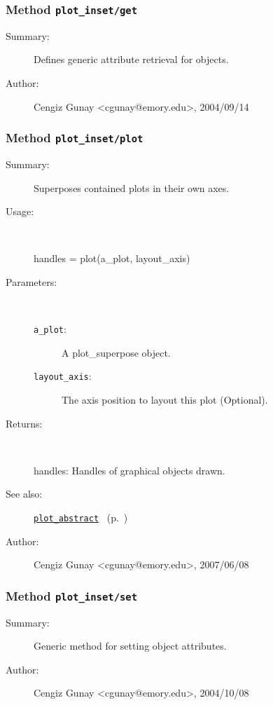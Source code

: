 \subsubsection[Method \texttt{get}]{Method \texttt{plot\_inset/get}}%
%
\label{ref_plot_inset__get}%
\hypertarget{ref_plot_inset__get}{}%
\begin{description}
\item[Summary:]Defines generic attribute retrieval for objects.
%
%
%
%
%
%
%
\item[Author:]%
Cengiz Gunay <cgunay@emory.edu>, 2004/09/14
%
\end{description}
\methodline%
\subsubsection[Method \texttt{plot}]{Method \texttt{plot\_inset/plot}}%
%
\label{ref_plot_inset__plot}%
\hypertarget{ref_plot_inset__plot}{}%
\begin{description}
\item[Summary:]Superposes contained plots in their own axes.
%
\item[Usage:]~%
\begin{lyxcode}%
handles = plot(a\_plot, layout\_axis)
%
\end{lyxcode}%
%
%
\item[Parameters:]~
\begin{description}%
\item[\texttt{a\_plot}:]
 A plot\_superpose object.
\item[\texttt{layout\_axis}:]
 The axis position to layout this plot (Optional). 
\end{description}%
%
\item[Returns:
]~

	handles: Handles of graphical objects drawn.
%
%
\item[See also:]%
\hyperlink{ref_plot_abstract}{\texttt{plot\_abstract}}%
\ (p.~\pageref{ref_plot_abstract})%
%
%
\item[Author:]%
Cengiz Gunay <cgunay@emory.edu>, 2007/06/08
%
\end{description}
\methodline%
\subsubsection[Method \texttt{set}]{Method \texttt{plot\_inset/set}}%
%
\label{ref_plot_inset__set}%
\hypertarget{ref_plot_inset__set}{}%
\begin{description}
\item[Summary:]Generic method for setting object attributes.
%
%
%
%
%
%
%
\item[Author:]%
Cengiz Gunay <cgunay@emory.edu>, 2004/10/08
%
\end{description}
\methodline%
